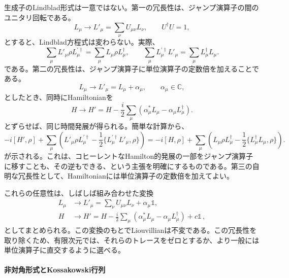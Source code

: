 \documentclass[a4paper,11pt,oneside]{article}
\theoremstyle{definition}
\numberwithin{equation}{section}
\begin{document}
生成子のLindblad形式は一意ではない。第一の冗長性は、ジャンプ演算子の間のユニタリ回転である。
\begin{equation}
L_\mu \to L'_\mu=\sum_\nu U_{\mu\nu}L_\nu ,
\qquad
U^\dagger U=1 ,
\end{equation}
とすると、Lindblad方程式は変わらない。実際、
\begin{equation}
\sum_\mu L'_\mu \rho L_\mu^{\prime\dagger}
=
\sum_\mu L_\mu \rho L_\mu^\dagger ,
\qquad
\sum_\mu L_\mu^{\prime\dagger}L'_\mu
=
\sum_\mu L_\mu^\dagger L_\mu .
\end{equation}
である。第二の冗長性は、ジャンプ演算子に単位演算子の定数倍を加えることである。
\begin{equation}
L_\mu \to L'_\mu=L_\mu+\alpha_\mu  ,
\qquad
\alpha_\mu\in\mathbb C ,
\end{equation}
としたとき、同時にHamiltonianを
\begin{equation}\label{Hshift}
H \to H'
=
H-\frac{i}{2}\sum_\mu\left(\alpha_\mu^*L_\mu-\alpha_\mu L_\mu^\dagger\right) .
\end{equation}
とずらせば、同じ時間発展が得られる。簡単な計算から、
\begin{equation}
-i[H',\rho]
+
\sum_\mu
\left(
L'_\mu \rho L_\mu^{\prime\dagger}
-\frac12\{L_\mu^{\prime\dagger}L'_\mu,\rho\}
\right)
=
-i[H,\rho]
+
\sum_\mu
\left(
L_\mu \rho L_\mu^\dagger
-\frac12\{L_\mu^\dagger L_\mu,\rho\}
\right) .
\end{equation}
が示される。これは、コヒーレントなHamilton的発展の一部をジャンプ演算子に移すことも、その逆もできる、という主張を明確にするものである。第三の自明な冗長性として、Hamiltonianには単位演算子の定数倍を加えてよい。



これらの任意性は、しばしば組み合わせた変換
\begin{align}\label{combinedredundancy}
L_\mu &\to L'_\mu=\sum_\nu U_{\mu\nu}L_\nu+\alpha_\mu \mathds{1} ,\\
H &\to H'
=
H-\frac{i}{2}\sum_\mu\left(\alpha_\mu^*L_\mu-\alpha_\mu L_\mu^\dagger\right)+c \mathds{1}\,,
\end{align}
としてまとめられる。この変換のもとでLiouvillianは不変である。この冗長性を取り除くため、有限次元では、それらのトレースをゼロとするか、より一般には単位演算子に直交するように選べる。





\paragraph{非対角形式とKossakowski行列}
\end{document}
